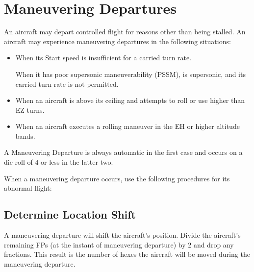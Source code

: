 \begin{advancedrules}
\begin{itemize}

    \end{itemize}

    \section{Maneuvering Departures}
    \label{rule:maneuvering-departures}

    An aircraft may depart controlled flight for reasons other than being stalled. An aircraft may experience maneuvering departures in the following situations:

    \begin{itemize}

        \item When its Start speed is insufficient for a carried turn rate.


             When it has poor supersonic maneuverability (PSSM), is supersonic, and its carried turn rate is not permitted.

        \item When an aircraft is above its ceiling and attempts to roll or use higher than EZ turns.

        \item When an aircraft executes a rolling maneuver in the EH or higher altitude bands.

    \end{itemize}

    A Maneuvering Departure is always automatic in the first case and occurs on a die roll of 4 or less in the latter two.

    When a maneuvering departure occurs, use the following procedures for its abnormal flight:

    \subsection{Determine Location Shift} A maneuvering departure will shift the aircraft's position. Divide the aircraft's remaining FPs (at the instant of maneuvering departure) by 2 and drop any fractions. This result is the number of hexes the aircraft will be moved during the maneuvering departure.


\end{advancedrules}
